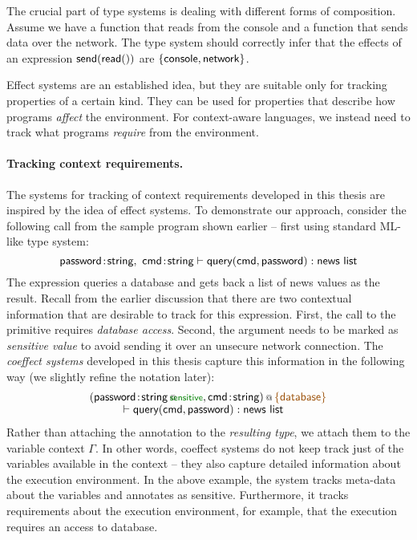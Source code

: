The crucial part of type systems is dealing with different forms of composition. Assume
we have a function  that reads from the console and a function  that sends
data over the network. The type system should correctly infer that the effects of an
expression $\textnormal{\sffamily send}(\textnormal{\sffamily read}())$ are $\{ \textnormal{\sffamily console}, \textnormal{\sffamily network} \}$.

Effect systems are an established idea, but they are suitable only for tracking properties of a
certain kind. They can be used for properties that describe how programs \emph{affect} the environment.
For context-aware languages, we instead need to track what programs \emph{require} from the environment.

\paragraph{Tracking context requirements.}

The systems for tracking of context requirements developed in this thesis are inspired by the idea
of effect systems. To demonstrate our approach, consider the following call from the sample program
shown earlier -- first using standard ML-like type system:
%
\begin{equation*}
\textnormal{\sffamily password}\!:\!\textnormal{\sffamily string},~\textnormal{\sffamily cmd}\!:\!\textnormal{\sffamily string}
  \vdash \textnormal{\sffamily query}(\textnormal{\sffamily cmd}, \textnormal{\sffamily password}) : \textnormal{\sffamily news list}
\end{equation*}
%
The expression queries a database and gets back a list of news values as the result. Recall from the
earlier discussion that there are two contextual information that are desirable to track for this
expression. First, the call to the  primitive requires \emph{database access}. Second,
the  argument needs to be marked as \emph{sensitive value} to avoid sending it over
an unsecure network connection. The \emph{coeffect systems} developed in this thesis capture this 
information in the following way (we slightly refine the notation later):
%
\begin{equation*}
\begin{array}{l}
 \coctx{( \ident{password}\!:\!\coctx{\ident{string}}{\hspace{-0.75em}\ident{\cclrd{\footnotesize sensitive}}},
   \ident{cmd}\!:\!\ident{string})}{ \aclrd{\{ \ident{database} \}}}  \\[-0.1em]
 \hspace{3em} \vdash\ident{query}(\ident{cmd}, \ident{password}) : \ident{news list}
\end{array}
\end{equation*}
%
Rather than attaching the annotation to the \emph{resulting type}, we attach them to the variable
context $\Gamma$. In other words, coeffect systems do not keep track just of the variables available
in the context -- they also capture detailed information about the execution environment.
In the above example, the system tracks meta-data about the variables and annotates  
as sensitive. Furthermore, it tracks requirements about the execution environment, for example,
that the execution requires an access to database.

